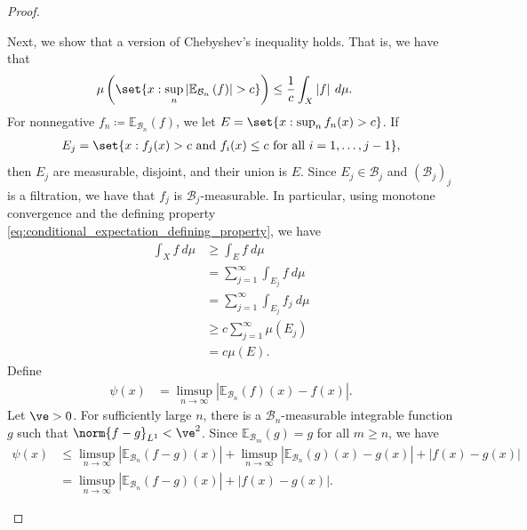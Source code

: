 \documentclass[10pt]{mypackage}
\renewcommand{\coloneq}{\coloneqq}
\begin{document}
\begin{proof}
\begin{enumerate}[(i)]
      Next, we show that a version of Chebyshev's inequality holds. That is, we have that
      \begin{align*}
        \mu\left( \set{x : \sup_{n} \left\vert \mathbb{E}_{\mathcal{B}_n}\left( f \right) \right\vert > c} \right) &\leq \frac{1}{c} \int_{X}^{} \left\vert f \right\vert\:d\mu.
      \end{align*}
      For nonnegative $f_n\coloneq \mathbb{E}_{\mathcal{B}_n}\left( f \right)$, we let $E = \set{x : \sup_{n}f_n(x) > c}$. If 
      \begin{align*}
        E_j = \set{x : f_j(x) > c\text{ and }f_i(x)\leq c\text{ for all }i=1,\dots,j-1},
      \end{align*}
      then $E_j$ are measurable, disjoint, and their union is $E$. Since $E_j\in \mathcal{B}_j$ and $\left( \mathcal{B}_j \right)_{j}$ is a filtration, we have that $f_j$ is $\mathcal{B}_j$-measurable. In particular, using monotone convergence and the defining property \eqref{eq:conditional_expectation_defining_property}, we have
      \begin{align*}
        \int_{X}^{} f\:d\mu &\geq \int_{E}^{} f\:d\mu\\
                            &= \sum_{j=1}^{\infty} \int_{E_j}^{} f\:d\mu\\
                            &= \sum_{j=1}^{\infty} \int_{E_j}^{} f_j\:d\mu\\
                            &\geq c\sum_{j=1}^{\infty} \mu\left( E_j \right)\\
                            &= c\mu\left( E \right).
      \end{align*}
      Define
      \begin{align*}
        \psi(x) &= \limsup_{n\to\infty} \left\vert \mathbb{E}_{\mathcal{B}_n}\left( f \right)(x) - f(x) \right\vert.
      \end{align*}
      Let $\ve > 0$. For sufficiently large $n$, there is a $\mathcal{B}_n$-measurable integrable function $g$ such that $\norm{f-g}_{L^1} < \ve^2$. Since $ \mathbb{E}_{\mathcal{B}_m}\left( g \right) = g$ for all $m\geq n$, we have
      \begin{align*}
        \psi(x) &\leq \limsup_{n\to\infty} \left\vert \mathbb{E}_{\mathcal{B}_n}\left( f-g \right)\left( x \right) \right\vert + \limsup_{n\to\infty} \left\vert \mathbb{E}_{\mathcal{B}_n}\left( g \right)(x) - g(x) \right\vert + \left\vert f(x)-g(x) \right\vert\\
                &= \limsup_{n\to\infty} \left\vert \mathbb{E}_{\mathcal{B}_n}\left( f-g \right)(x) \right\vert + \left\vert f(x)-g(x) \right\vert.

\end{align*}
\end{enumerate}
\end{proof}
\end{document}
